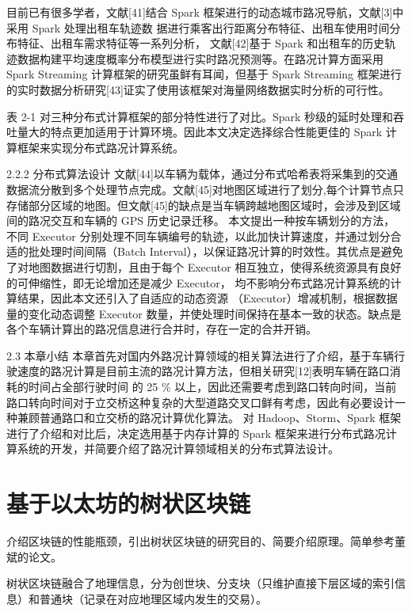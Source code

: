 目前已有很多学者，文献[41]结合 Spark 框架进行的动态城市路况导航，文献[3]中采用 Spark 处理出租车轨迹数 据进行乘客出行距离分布特征、出租车使用时间分布特征、出租车需求特征等一系列分析， 文献[42]基于 Spark 和出租车的历史轨迹数据构建平均速度概率分布模型进行实时路况预测等。在路况计算方面采用 Spark Streaming 计算框架的研究虽鲜有耳闻，但基于 Spark Streaming 框架进行的实时数据分析研究[43]证实了使用该框架对海量网络数据实时分析的可行性。

表 2-1 对三种分布式计算框架的部分特性进行了对比。Spark 秒级的延时处理和吞吐量大的特点更加适用于计算环境。因此本文决定选择综合性能更佳的 Spark 计算框架来实现分布式路况计算系统。



2.2.2 分布式算法设计
文献[44]以车辆为载体，通过分布式哈希表将采集到的交通数据流分散到多个处理节点完成。文献[45]对地图区域进行了划分,每个计算节点只存储部分区域的地图。但文献[45]的缺点是当车辆跨越地图区域时，会涉及到区域间的路况交互和车辆的 GPS 历史记录迁移。
本文提出一种按车辆划分的方法，不同 Executor 分别处理不同车辆编号的轨迹，以此加快计算速度，并通过划分合适的批处理时间间隔（Batch Interval），以保证路况计算的时效性。其优点是避免了对地图数据进行切割，且由于每个 Executor 相互独立，使得系统资源具有良好的可伸缩性，即无论增加还是减少 Executor， 均不影响分布式路况计算系统的计算结果，因此本文还引入了自适应的动态资源 （Executor）增减机制，根据数据量的变化动态调整 Executor 数量，并使处理时间保持在基本一致的状态。缺点是各个车辆计算出的路况信息进行合并时，存在一定的合并开销。

2.3 本章小结
本章首先对国内外路况计算领域的相关算法进行了介绍，基于车辆行驶速度的路况计算是目前主流的路况计算方法，但相关研究[12]表明车辆在路口消耗的时间占全部行驶时间 的 25 \% 以上，因此还需要考虑到路口转向时间，当前路口转向时间对于立交桥这种复杂的大型道路交叉口鲜有考虑，因此有必要设计一种兼顾普通路口和立交桥的路况计算优化算法。
对 Hadoop、Storm、Spark 框架进行了介绍和对比后，决定选用基于内存计算的 Spark 框架来进行分布式路况计算系统的开发，并简要介绍了路况计算领域相关的分布式算法设计。





\section{基于以太坊的树状区块链}
介绍区块链的性能瓶颈，引出树状区块链的研究目的、简要介绍原理。简单参考董斌的论文。

树状区块链融合了地理信息，分为创世块、分支块（只维护直接下层区域的索引信息）和普通块（记录在对应地理区域内发生的交易）。

